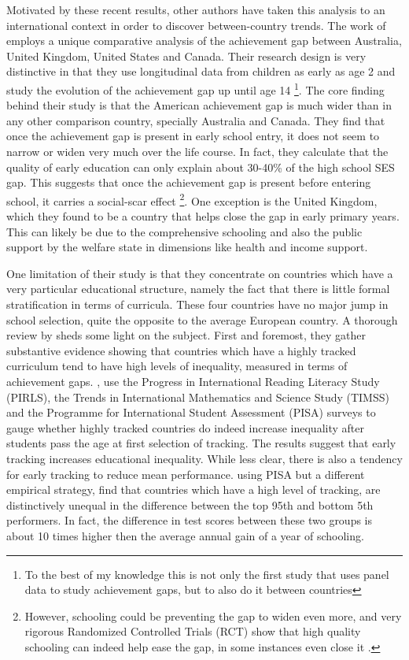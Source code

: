 \documentclass[11pt, a4paper]{article}\usepackage[]{graphicx}\usepackage[]{color}
\begin{document}
Motivated by these recent results, other authors have taken this analysis to an international context in order to discover between-country trends. The work of \citet{bradbury2015} employs a unique comparative analysis of the achievement gap between Australia, United Kingdom, United States and Canada. Their research design is very distinctive in that they use longitudinal data from children as early as age 2 and study the evolution of the achievement gap up until age 14 \footnote{To the best of my knowledge this is not only the first study that uses panel data to study achievement gaps, but to also do it between countries}. The core finding behind their study is that the American achievement gap is much wider than in any other comparison country, specially Australia and Canada. They find that once the achievement gap is present in early school entry, it does not seem to narrow or widen very much over the life course. In fact, they calculate that the quality of early education can only explain about  30-40\% of the high school SES gap. This suggests that once the achievement gap is present before entering school, it carries a social-scar effect \footnote{However, schooling could be preventing the gap to widen even more, and very rigorous Randomized Controlled Trials (RCT) show that high quality schooling can indeed help ease the gap, in some instances even close it \citep{campbell2002}.}. One exception is the United Kingdom, which they found to be a country that helps close the gap in early primary years. This can likely be due to the comprehensive schooling and also the public support by the welfare state in dimensions like health and income support.

One limitation of their study is that they concentrate on countries which have a very particular educational structure, namely the fact that there is little formal stratification in terms of curricula. These four countries have no major jump in school selection, quite the opposite to the average European country. A thorough review by \citet{werfhorst_mijs} sheds some light on the subject. First and foremost, they gather substantive evidence showing that countries which have a highly tracked curriculum tend to have high levels of inequality, measured in terms of achievement gaps. \citet{hanushek_woesmann_tracking}, use the Progress in International Reading Literacy Study (PIRLS), the Trends in International Mathematics and Science Study (TIMSS) and the Programme for International Student Assessment (PISA) surveys to gauge whether highly tracked countries do indeed increase inequality after students pass the age at first selection of tracking. The results suggest that early tracking increases educational inequality. While less clear, there is also a tendency for early tracking to reduce mean performance. \citet{micklewright} using PISA but a different empirical strategy, find that countries which have a high level of tracking, are distinctively unequal in the difference between the top 95th and bottom 5th performers. In fact, the difference in test scores between these two groups is about 10 times higher then the average annual gain of a year of schooling.
\end{document}
